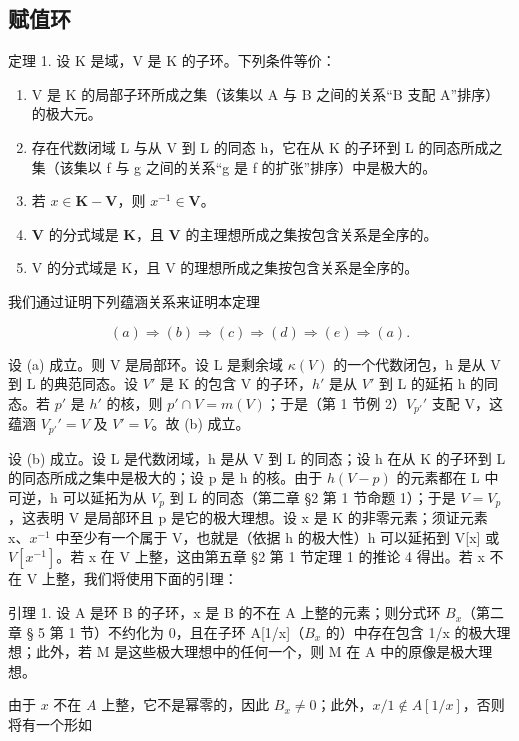 \subsection{赋值环}

定理 1. 设 K 是域，V 是 K 的子环。下列条件等价：

\begin{enumerate}
\def\labelenumi{(\alph{enumi})}
\item
  V 是 K 的局部子环所成之集（该集以 A 与 B 之间的关系“B 支配 A”排序）的极大元。
\item
  存在代数闭域 L 与从 V 到 L 的同态 h，它在从 K 的子环到 L 的同态所成之集（该集以 f 与 g 之间的关系“g 是 f 的扩张”排序）中是极大的。
\item
  若 \(x \in \mathbf{K} - \mathbf{V}\)，则 \(x^{-1} \in \mathbf{V}\)。
\item
  \(\mathbf{V}\) 的分式域是 \(\mathbf{K}\)，且 \(\mathbf{V}\) 的主理想所成之集按包含关系是全序的。
\item
  V 的分式域是 K，且 V 的理想所成之集按包含关系是全序的。
\end{enumerate}

我们通过证明下列蕴涵关系来证明本定理

\[
(a) \Rightarrow (b) \Rightarrow (c) \Rightarrow (d) \Rightarrow (e) \Rightarrow (a).
\]

设 (a) 成立。则 V 是局部环。设 L 是剩余域 \(\kappa(V)\) 的一个代数闭包，h 是从 V 到 L 的典范同态。设 \(V'\) 是 K 的包含 V 的子环，\(h'\) 是从 \(V'\) 到 L 的延拓 h 的同态。若 \(p'\) 是 \(h'\) 的核，则 \(p' \cap V = m(V)\)；于是（第 1 节例 2）\(V_{p'}'\) 支配 V，这蕴涵 \(V_{p'}' = V\) 及 \(V' = V\)。故 (b) 成立。

设 (b) 成立。设 L 是代数闭域，h 是从 V 到 L 的同态；设 h 在从 K 的子环到 L 的同态所成之集中是极大的；设 p 是 h 的核。由于 \(h(V - p)\) 的元素都在 L 中可逆，h 可以延拓为从 \(V_{p}\) 到 L 的同态（第二章 §2 第 1 节命题 1）；于是 \(V = V_{p}\)，这表明 V 是局部环且 p 是它的极大理想。设 x 是 K 的非零元素；须证元素 x、\(x^{-1}\) 中至少有一个属于 V，也就是（依据 h 的极大性）h 可以延拓到 V{[}x{]} 或 \(V[x^{-1}]\)。若 x 在 V 上整，这由第五章 §2 第 1 节定理 1 的推论 4 得出。若 x 不在 V 上整，我们将使用下面的引理：

引理 1. 设 A 是环 B 的子环，x 是 B 的不在 A 上整的元素；则分式环 \(B_{x}\)（第二章 § 5 第 1 节）不约化为 0，且在子环 A{[}1/x{]}（\(B_{x}\) 的）中存在包含 1/x 的极大理想；此外，若 M 是这些极大理想中的任何一个，则 M 在 A 中的原像是极大理想。

由于 \(x\) 不在 \(A\) 上整，它不是幂零的，因此 \(B_x \neq 0\)；此外，\(x / 1 \notin A[1 / x]\)，否则将有一个形如

